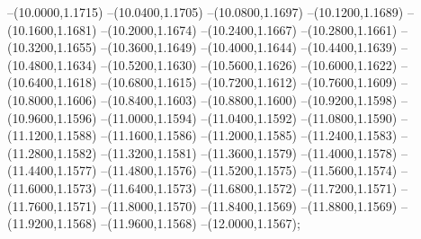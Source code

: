 {	--(10.0000,1.1715)
	--(10.0400,1.1705)
	--(10.0800,1.1697)
	--(10.1200,1.1689)
	--(10.1600,1.1681)
	--(10.2000,1.1674)
	--(10.2400,1.1667)
	--(10.2800,1.1661)
	--(10.3200,1.1655)
	--(10.3600,1.1649)
	--(10.4000,1.1644)
	--(10.4400,1.1639)
	--(10.4800,1.1634)
	--(10.5200,1.1630)
	--(10.5600,1.1626)
	--(10.6000,1.1622)
	--(10.6400,1.1618)
	--(10.6800,1.1615)
	--(10.7200,1.1612)
	--(10.7600,1.1609)
	--(10.8000,1.1606)
	--(10.8400,1.1603)
	--(10.8800,1.1600)
	--(10.9200,1.1598)
	--(10.9600,1.1596)
	--(11.0000,1.1594)
	--(11.0400,1.1592)
	--(11.0800,1.1590)
	--(11.1200,1.1588)
	--(11.1600,1.1586)
	--(11.2000,1.1585)
	--(11.2400,1.1583)
	--(11.2800,1.1582)
	--(11.3200,1.1581)
	--(11.3600,1.1579)
	--(11.4000,1.1578)
	--(11.4400,1.1577)
	--(11.4800,1.1576)
	--(11.5200,1.1575)
	--(11.5600,1.1574)
	--(11.6000,1.1573)
	--(11.6400,1.1573)
	--(11.6800,1.1572)
	--(11.7200,1.1571)
	--(11.7600,1.1571)
	--(11.8000,1.1570)
	--(11.8400,1.1569)
	--(11.8800,1.1569)
	--(11.9200,1.1568)
	--(11.9600,1.1568)
	--(12.0000,1.1567);
}
